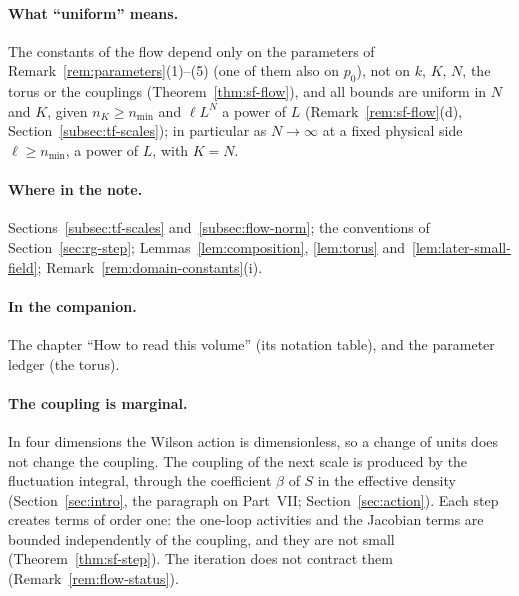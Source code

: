 \paragraph{What ``uniform'' means.} The constants of the flow depend only on the parameters of Remark~\ref{rem:parameters}(1)--(5) (one of them also on $p_0$), not on $k$, $K$, $N$, the torus or the couplings (Theorem~\ref{thm:sf-flow}), and all bounds are uniform in $N$ and $K$, given $n_K\ge n_{\min}$ and $\ell L^N$ a power of $L$ (Remark~\ref{rem:sf-flow}(d), Section~\ref{subsec:tf-scales}); in particular as $N\to\infty$ at a fixed physical side $\ell\ge n_{\min}$, a power of $L$, with $K=N$.

\paragraph{Where in the note.} Sections~\ref{subsec:tf-scales} and~\ref{subsec:flow-norm}; the conventions of Section~\ref{sec:rg-step}; Lemmas~\ref{lem:composition}, \ref{lem:torus} and~\ref{lem:later-small-field}; Remark~\ref{rem:domain-constants}(i).

\paragraph{In the companion.} The chapter ``How to read this volume'' (its notation table), and the parameter ledger (the torus).

\label{g:strategy}

\paragraph{The coupling is marginal.} In four dimensions the Wilson action is dimensionless, so a change of units does not change the coupling. The coupling of the next scale is produced by the fluctuation integral, through the coefficient $\beta$ of $S$ in the effective density (Section~\ref{sec:intro}, the paragraph on Part~VII; Section~\ref{sec:action}). Each step creates terms of order one: the one-loop activities and the Jacobian terms are bounded independently of the coupling, and they are not small (Theorem~\ref{thm:sf-step}). The iteration does not contract them (Remark~\ref{rem:flow-status}).

